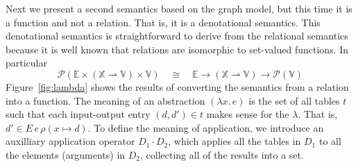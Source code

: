 \documentclass{tufte-handout}
\newcommand{\LAM}[1]{\lambda #1.\,}
\newcommand{\SET}[1]{\mathcal{P}(#1)}
\newcommand{\ext}[3]{#3(#1{\mapsto}#2)}
\begin{document}
Next we present a second semantics based on the graph model, but this
time it is a function and not a relation. That is, it is a
denotational semantics. This denotational semantics is straightforward
to derive from the relational semantics because it is well known that
relations are isomorphic to set-valued functions. In particular
\[
  \SET{\mathbb{E} \times (\mathbb{X}\rightharpoonup \mathbb{V}) \times \mathbb{V}}
  \quad\cong\quad
  \mathbb{E} \to (\mathbb{X}\rightharpoonup \mathbb{V}) \to \SET{\mathbb{V}}
\]
Figure~\ref{fig:lambda} shows the results of converting the semantics
from a relation into a function.
%
%
The meaning of an abstraction $(\LAM{x}e)$ is the set of all tables
$t$ such that each input-output entry $(d,d')\in t$ makes sense for
the $\lambda$. That is, $d' \in E\,e\,\ext{x}{ d}{\rho}$.
%
To define the meaning of application, we introduce an auxilliary
application operator $D_1 \cdot D_2$, which applies all the tables in
$D_1$ to all the elements (arguments) in $D_2$, collecting all of the
results into a set.
\end{document}
